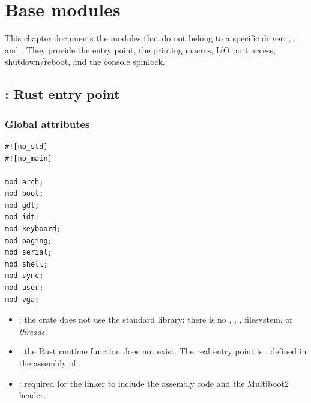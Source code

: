 \chapter{Base modules}
\label{cap:base}

This chapter documents the modules that do not belong to a specific driver:
, , and . They provide the entry
point, the printing macros, I/O port access,
shutdown/reboot, and the console spinlock.

\section{: Rust entry point}

\subsection{Global attributes}

\begin{lstlisting}[caption={Attributes and modules declared in \code{main.rs}.},label={lst:mainattrs}]
#![no_std]
#![no_main]

mod arch;
mod boot;
mod gdt;
mod idt;
mod keyboard;
mod paging;
mod serial;
mod shell;
mod sync;
mod user;
mod vga;
\end{lstlisting}

\begin{itemize}
  \item {}: the crate does not use the standard library; there is no
        , , , filesystem, or
        \emph{threads}.
  \item {}: the Rust runtime  function does not exist.
        The real entry point is , defined in the
        assembly of .
  \item {}: required for the linker to include the assembly code
        and the Multiboot2 header.
\end{itemize}

\subsection{}

